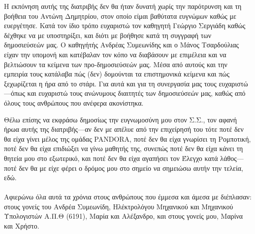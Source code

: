 \cleardoublepage

Η εκπόνηση αυτής της διατριβής δεν θα ήταν δυνατή χωρίς την παρότρυνση και τη
βοήθεια του Αντώνη Δημητρίου, στον οποίο είμαι βαθύτατα ευγνώμων καθώς με
ευεργέτησε. Κατά τον ίδιο τρόπο ευχαριστώ τον καθηγητή Γεώργιο Σεργιάδη καθώς
δέχθηκε να με υποστηρίξει, και διότι με βοήθησε κατά τη συγγραφή των
δημοσιεύσεών μας. Ο καθηγήτής Ανδρέας Συμεωνίδης και ο Μάνος Τσαρδούλιας είχαν
την υπομονή και κατέβαλαν τον κόπο να διαβάσουν με επιμέλεια και να βελτιώσουν
τα κείμενα των προ-δημοσιεύσεών μας. Μέσα από αυτούς και την εμπειρία τους
κατάλαβα πώς (δεν) δομούνται τα επιστημονικά κείμενα και πώς ξεχωρίζεται η ήρα
από το στάρι. Για αυτά και για τη συνεργασία μας τους ευχαριστώ---όπως και
ευχαριστώ τους ανώνυμους διαιτητές των δημοσιεύσεών μας, καθώς από όλους τους
ανθρώπους που ανέφερα ακονίστηκα.

Θέλω επίσης να εκφράσω δημοσίως την ευγνωμοσύνη μου στον Σ.Σ., τον αφανή ήρωα
αυτής της διατριβής---αν δεν με απέλυε από την επιχείρησή του τότε ποτέ δεν θα
είχα γίνει μέλος της ομάδας PANDORA, ποτέ δεν θα είχα γνωρίσει τη Ρομποτική,
ποτέ δεν θα είχα επιδιώξει να γίνω μαθητής της, συνεπώς ποτέ δεν θα είχα κάνει
τη θητεία μου στο εξωτερικό, και ποτέ δεν θα είχα αγαπήσει τον Έλεγχο κατά
λάθος---ποτέ δεν θα με είχε φέρει ο δρόμος μου στο σημείο να σημειώσω αυτήν την
τελεία, εδώ.  \\ \\

Αφιερώνω όλα αυτά τα χρόνια στους ανθρώπους που έμμεσα και άμεσα με διέπλασαν:
στους γονείς του Ανδρέα Συμεωνίδη, Ηλέκτρολόγου Μηχανικού και Μηχανικού
Υπολογιστών Α.Π.Θ (6191), Μαρία και Αλέξανδρο, και στους γονείς μου, Μαρίνα και
Χρήστο.

\restoregeometry
\cleardoublepage
